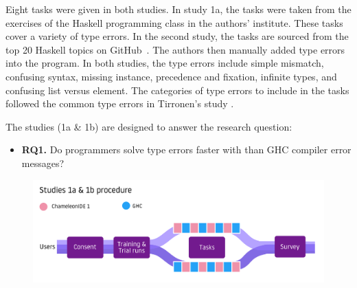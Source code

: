 Eight tasks were given in both studies. In study 1a, the tasks were taken from the exercises of the Haskell programming class in the authors' institute. These tasks cover a variety of type errors.  In the second study, the tasks are sourced from the top 20 Haskell topics on GitHub~\cite{github_github_2022}. The authors then manually added type errors into the program. In both studies, the type errors include simple mismatch, confusing syntax, missing instance, precedence and fixation, infinite types, and confusing list versus element. The categories of type errors to include in the tasks followed the common type errors in Tirronen's study \cite{tirronen_understanding_2015}. 

The  studies (1a \& 1b) are designed to answer the research question:
\begin{itemize}
    \item \textbf{RQ1.} Do programmers solve type errors faster with \chameleon{} than GHC compiler error messages?
\end{itemize}

\begin{figure}[h]
    \centering
    \includegraphics[width=\linewidth]{images/procedure-1.pdf}
    \caption{}
    \label{fig:procedure-1}
\end{figure}



